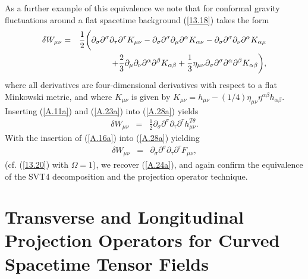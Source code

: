 As a further example of this equivalence we note that for conformal gravity fluctuations around a flat spacetime background (\ref{13.18}) takes the form
%
\begin{eqnarray}
\delta W_{\mu\nu}&=&\frac{1}{2}\bigg{(}\partial_{\sigma}\partial^{\sigma}\partial_{\tau}\partial^{\tau}K_{\mu\nu}
-\partial_{\sigma}\partial^{\sigma}\partial_{\mu}\partial^{\alpha}K_{\alpha\nu}
-\partial_{\sigma}\partial^{\sigma}\partial_{\nu}\partial^{\alpha}K_{\alpha\mu} 
\nonumber\\
&&
+\frac{2}{3}\partial_{\mu}\partial_{\nu}\partial^{\alpha}\partial^{\beta}K_{\alpha\beta}+\frac{1}{3}\eta_{\mu\nu}\partial_{\sigma}\partial^{\sigma}\partial^{\alpha}\partial^{\beta}K_{\alpha\beta}\bigg{)},
\label{A.28a}
\end{eqnarray} 
%
where all derivatives are four-dimensional derivatives with respect to a flat Minkowski metric, and where $K_{\mu\nu}$ is given by $K_{\mu\nu}=h_{\mu\nu}-(1/4)\eta_{\mu\nu}\eta^{\alpha\beta}h_{\alpha\beta}$. Inserting (\ref{A.11a}) and (\ref{A.23a}) into (\ref{A.28a}) yields
%
\begin{eqnarray}
\delta W_{\mu\nu}&=&\frac{1}{2}\partial_{\sigma}\partial^{\sigma}\partial_{\tau}\partial^{\tau}h^{T\theta}_{\mu\nu}.
\label{A.29a}
\end{eqnarray} 
%
With the insertion of (\ref{A.16a}) into (\ref{A.28a}) yielding 
%
\begin{eqnarray}
\delta W_{\mu\nu}&=&\partial_{\sigma}\partial^{\sigma}\partial_{\tau}\partial^{\tau}F_{\mu\nu},
\label{A.30a}
\end{eqnarray} 
%
(cf. (\ref{13.20}) with $\Omega=1$), we recover (\ref{A.24a}), and again confirm the equivalence of the  SVT4 decomposition and the projection operator technique.

\section{Transverse and Longitudinal Projection Operators for Curved Spacetime Tensor Fields}
\label{aas:tt_long_curved_proj}


